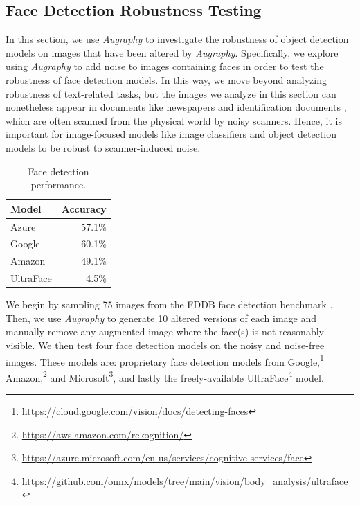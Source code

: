 \documentclass[runningheads]{llncs}
\begin{document}
\subsection{Face Detection Robustness Testing}
In this section, we use \emph{Augraphy} to investigate the robustness of object detection models on images that have been altered by \emph{Augraphy}.
Specifically, we explore using \emph{Augraphy} to add noise to images containing faces in order to test the robustness of face detection models.
In this way, we move beyond analyzing robustness of text-related tasks, but the images we analyze in this section can nonetheless appear in documents like newspapers \cite{newspaper-navigator} and identification documents \cite{midv-500}, which are often scanned from the physical world by noisy scanners.
Hence, it is important for image-focused models like image classifiers and object detection models to be robust to scanner-induced noise.

\begin{table}
    \centering
    \caption{Face detection performance.}
    \begin{tabular}{lr}
    \toprule
        \textbf{Model} & \textbf{Accuracy} \\
        \midrule
        Azure & 57.1\%\\
        Google & 60.1\%  \\
        Amazon & 49.1\% \\
        UltraFace & 4.5\%\\
        \bottomrule
    \end{tabular}
    \label{tab:face-detection-results}
\end{table}

We begin by sampling 75 images from the FDDB face detection benchmark \cite{fddbTech}.
Then, we use \emph{Augraphy} to generate 10 altered versions of each image and manually remove any augmented image where the face(s) is not reasonably visible.
We then test four face detection models on the noisy and noise-free images.
These models are: proprietary face detection models from Google,\footnote{\url{https://cloud.google.com/vision/docs/detecting-faces}} Amazon,\footnote{\url{https://aws.amazon.com/rekognition/}} and Microsoft\footnote{\url{https://azure.microsoft.com/en-us/services/cognitive-services/face}}, and lastly the freely-available UltraFace\footnote{\url{https://github.com/onnx/models/tree/main/vision/body_analysis/ultraface}} model.
\end{document}
